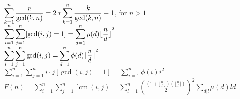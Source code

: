 \begin{multicols*}{3}
$\displaystyle \displaystyle \sum_{k=1}^n \frac{n}{\gcd(k, n)} = 2 * \displaystyle \sum_{k=1}^n \frac{k}{\gcd(k, n)} - 1$, for $n > 1$ \\
$\displaystyle \displaystyle \sum_{i=1}^n \sum_{j=1}^n [\gcd(i, j) = 1] = \displaystyle \sum_{d=1}^n \mu(d) \lfloor {\frac{n}{d} \rfloor}^2$ \\
$\displaystyle \displaystyle \sum_{i=1}^n \displaystyle\sum_{j=1}^n \gcd(i, j) = \displaystyle \sum_{d=1}^n \phi(d) \lfloor {\frac{n}{d} \rfloor}^2$ \\
$\displaystyle \sum_{i=1}^n \sum_{j=1}^n i \cdot j[\gcd(i, j) = 1] = \sum_{i=1}^n \phi(i)i^2$ \\
$\displaystyle F(n) = \displaystyle \sum_{i=1}^n \displaystyle \sum_{j=1}^n \operatorname{lcm}(i, j) = \displaystyle \sum_{l=1}^n {\left(\frac{\left( 1 + \lfloor{\frac{n}{l} \rfloor} \right) \left( \lfloor{\frac{n}{l} \rfloor} \right)} {2} \right)}^2 \displaystyle \sum_{d|l} \mu(d)ld$ \\
\end{multicols*}
